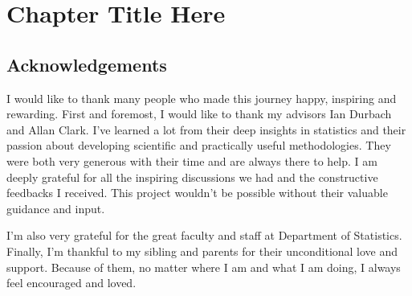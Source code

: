 
\chapter{Chapter Title Here} %

\label{Chapter1} %


\newcommand{\keyword}[1]{\textbf{#1}}
\newcommand{\tabhead}[1]{\textbf{#1}}
\newcommand{\code}[1]{\texttt{#1}}
\newcommand{\file}[1]{\texttt{\bfseries#1}}
\newcommand{\option}[1]{\texttt{\itshape#1}}


\section{Acknowledgements}


I would like to thank many people who made this journey happy, inspiring and rewarding. First and foremost, I would like to thank my advisors Ian Durbach and Allan Clark. I’ve learned a lot from their deep insights in statistics and their passion about developing scientific and practically useful methodologies.  They were both very generous with their time and are always there to help. I am deeply grateful for all the inspiring discussions we had and the constructive feedbacks I received. This project wouldn’t be possible without their valuable guidance and input. 

I’m also very grateful for the great faculty and staff at Department of Statistics. Finally, I’m thankful to my sibling and parents for their unconditional love and support. Because of them, no matter where I am and what I am doing, I always feel encouraged and loved.
